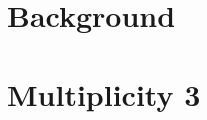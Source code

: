 \documentclass[11pt]{article}
\title{}
\begin{document}
 

\section*{Background}


\section*{Multiplicity 3}




\end{document}
